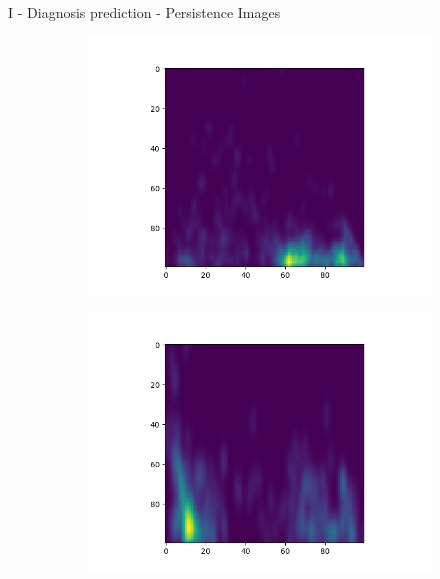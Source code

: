 \documentclass[aspectratio=169, 10pt, dvipsnames]{beamer}
\begin{document}
\begin{frame}[fragile]{I - Diagnosis prediction - Persistence Images}
\begin{figure}
\begin{subfigure}{0.32\textwidth}
    \includegraphics[width=\textwidth]{figures/PIs/Persistence_image_CN_h_2.png}
  \end{subfigure}
  \begin{subfigure}{0.32\textwidth}
    \includegraphics[width=\textwidth]{figures/PIs/Persistence_image_AD_h_0.png}
  \end{subfigure}
  \begin{subfigure}{0.32\textwidth}

\end{subfigure}
\end{figure}
\end{frame}
\end{document}
